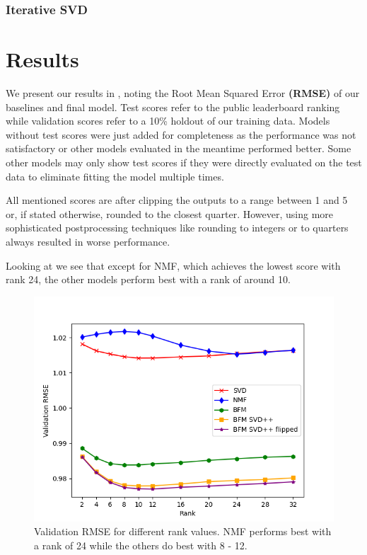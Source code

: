 \documentclass[10pt,conference,compsocconf]{IEEEtran}
\begin{document}
    \subsubsection{Iterative SVD}


    \section{Results}
    We present our results in , noting the Root Mean Squared Error \textbf{(RMSE)} of our baselines and final model.
    Test scores refer to the public leaderboard ranking while validation scores refer to a 10\% holdout of our training data.
    Models without test scores were just added for completeness as the performance was not satisfactory or other models evaluated in the meantime performed better.
    Some other models may only show test scores if they were directly evaluated on the test data to eliminate
    fitting the model multiple times.

    All mentioned scores are after clipping the outputs to a range between 1 and 5 or, if stated otherwise, rounded to the closest quarter.
    However, using more sophisticated postprocessing techniques like rounding to integers or to quarters always resulted in worse performance.

    Looking at  we see that except for NMF, which achieves the lowest score with rank 24, the other models perform best with a rank of around 10.
    \begin{figure}
        \includegraphics[width=\columnwidth]{figures/rank.png}
        \caption{Validation RMSE for different rank values.
        NMF performs best with a rank of 24 while the others do best with 8 - 12.}
        \label{fig:rank}
    \end{figure}
\end{document}
